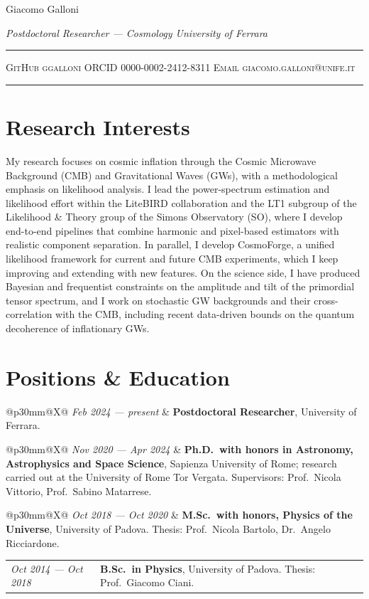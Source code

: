\documentclass[10pt,a4paper]{article}
\makeatletter
\newcommand{\cvrow}[2]{%
  \noindent\begin{tabularx}{\linewidth}{@{}p{30mm}@{\hspace{4mm}}X@{}}
    {\itshape\small\textcolor{muted}{#1}} & #2 \\
  \end{tabularx}\par\vspace{0.3pt}
}
\newcommand{\cvheader}[3]{%
  {\fontsize{28pt}{30pt}\selectfont #1}\par\vspace{2pt}
  {\itshape\textcolor{muted}{#2}}\par\vspace{6pt}
  \textcolor{rule}{\rule{\linewidth}{0.4pt}}\vspace{3pt}\par
  {\footnotesize\scshape #3}\par
  \vspace{1pt}\textcolor{rule}{\rule{\linewidth}{0.4pt}}\par
}
\makeatother
\begin{document}
\cvheader
  {Giacomo Galloni}
  {Postdoctoral Researcher --- Cosmology \textperiodcentered{} University of Ferrara}
  {GitHub\,\textperiodcentered\,ggalloni \quad ORCID\,\textperiodcentered\,0000-0002-2412-8311 \quad Email\,\textperiodcentered\,giacomo.galloni@unife.it}

\section*{Research Interests}
\justifying
My research focuses on cosmic inflation through the Cosmic Microwave Background (CMB) and
Gravitational Waves (GWs), with a methodological emphasis on likelihood analysis. I lead the
power-spectrum estimation and likelihood effort within the LiteBIRD collaboration and the LT1
subgroup of the Likelihood \& Theory group of the Simons Observatory (SO), where I develop end-to-end pipelines that combine
harmonic and pixel-based estimators with realistic component separation. In parallel, I develop CosmoForge, a unified likelihood framework for current and future CMB experiments, which I keep improving and extending with new features. On the
science side, I have produced Bayesian and frequentist constraints on the amplitude and tilt of the
primordial tensor spectrum, and I work on stochastic GW backgrounds and their cross-correlation
with the CMB, including recent data-driven bounds on the quantum decoherence of inflationary GWs.

\section*{Positions \& Education}
\cvrow{Feb 2024 --- present}{\textbf{Postdoctoral Researcher}, University of Ferrara.}
\cvrow{Nov 2020 --- Apr 2024}{\textbf{Ph.D.\ with honors in Astronomy, Astrophysics and Space Science}, Sapienza University of Rome; research carried out at the University of Rome Tor Vergata. \textcolor{muted}{Supervisors: Prof.\ Nicola Vittorio, Prof.\ Sabino Matarrese.}}
\cvrow{Oct 2018 --- Oct 2020}{\textbf{M.Sc.\ with honors, Physics of the Universe}, University of Padova. \textcolor{muted}{Thesis: Prof.\ Nicola Bartolo, Dr.\ Angelo Ricciardone.}}
\cvrow{Oct 2014 --- Oct 2018}{\textbf{B.Sc.\ in Physics}, University of Padova. \textcolor{muted}{Thesis: Prof.\ Giacomo Ciani.}}

\end{document}
